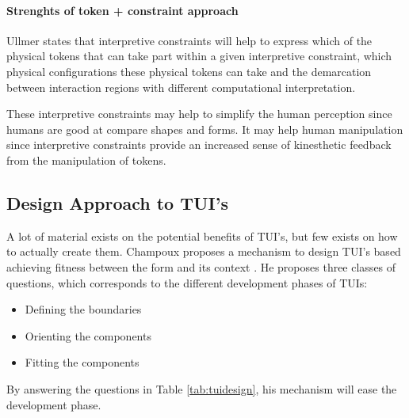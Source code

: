 \paragraph{Strenghts of token + constraint approach}
Ullmer states that interpretive constraints will help to express which of the physical tokens that can take part within a given interpretive constraint, which physical configurations these physical tokens can take and the demarcation between interaction regions with different computational interpretation.

These interpretive constraints may help to simplify the human perception since humans are good at compare shapes and forms. 
It may help human manipulation since interpretive constraints provide an increased sense of kinesthetic feedback from the manipulation of tokens. 



\subsection{Design Approach to TUI's}
A lot of material exists on the potential benefits of TUI's, but few exists on how to actually create them. Champoux proposes a mechanism to design TUI's based achieving fitness between the form and its context \cite{subramaniandesign}.
He proposes three classes of questions, which corresponds to the different development phases of TUIs:
\begin{itemize}
  \item Defining the boundaries
  \item Orienting the components
  \item Fitting the components
\end{itemize} 


By answering the questions in Table \ref{tab:tuidesign}, his mechanism will ease the development phase.   


